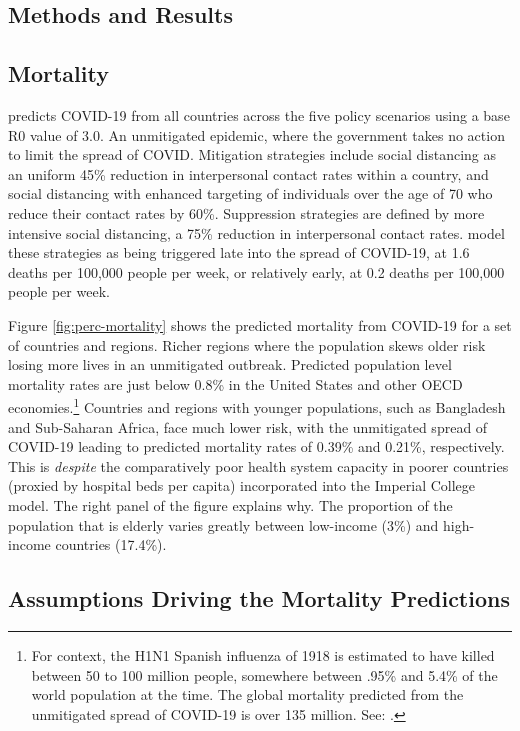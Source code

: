 \documentclass[11pt]{article}
\begin{document}
\begin{mdframed}
\section{Methods and Results}

\subsection{Mortality}

\textcite{walker2020} predicts COVID-19 from all countries across the five policy scenarios using a base R0 value of 3.0. An unmitigated epidemic, where the government takes no action to limit the spread of COVID. Mitigation strategies include social distancing as an uniform 45\% reduction in interpersonal contact rates within a country, and social distancing with enhanced targeting of individuals over the age of 70 who reduce their contact rates by 60\%. Suppression strategies are defined by more intensive social distancing, a 75\% reduction in interpersonal contact rates. \textcite{walker2020} model these strategies as being triggered late into the spread of COVID-19, at 1.6 deaths per 100,000 people per week, or relatively early, at 0.2 deaths per 100,000 people per week.
 
Figure \ref{fig:perc-mortality} shows the predicted mortality from COVID-19 for a set of countries and regions. Richer regions where the population skews older risk losing more lives in an unmitigated outbreak. Predicted population level mortality rates are just below 0.8\% in the United States and other OECD economies.\footnote{
    For context, the H1N1 Spanish influenza of 1918 is estimated to have killed between 50 to 100 million people, somewhere between .95\% and 5.4\% of the world population at the time. The global mortality predicted from the unmitigated spread of COVID-19 is over 135 million. See: \textcite{taubenberger2006,johnson2002}.}
Countries and regions with younger populations, such as Bangladesh and Sub-Saharan Africa, face much lower risk, with the unmitigated spread of COVID-19 leading to predicted mortality rates of 0.39\% and 0.21\%, respectively. This is \emph{despite} the comparatively poor health system capacity in poorer countries (proxied by hospital beds per capita) incorporated into the Imperial College model. The right panel of the figure explains why. The proportion of the population that is elderly varies greatly between low-income (3\%) and high-income countries (17.4\%).


\subsection{Assumptions Driving the Mortality Predictions}


\end{mdframed}
\end{document}
